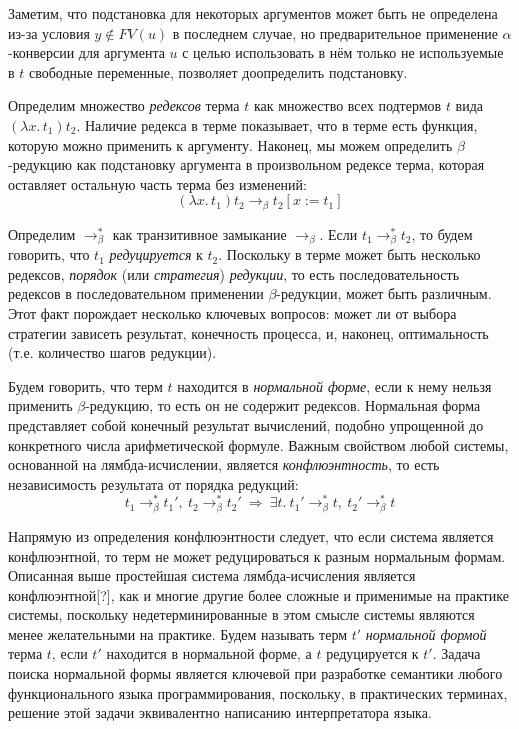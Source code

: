 \documentclass[../diploma.tex]{subfiles}
\begin{document}
Заметим, что подстановка для некоторых аргументов может быть не определена из-за условия $y \notin FV(u)$ в последнем случае, но предварительное применение $\alpha$-конверсии для аргумента $u$ с целью использовать в нём только не используемые в $t$ свободные переменные, позволяет доопределить подстановку.

Определим множество \textit{редексов} терма $t$ как множество всех подтермов $t$ вида $(\lambda x.\, t_1) t_2$. Наличие редекса в терме показывает, что в терме есть функция, которую можно применить к аргументу. Наконец, мы можем определить $\beta$-редукцию как подстановку аргумента в произвольном редексе терма, которая оставляет остальную часть терма без изменений:
$$(\lambda x.\, t_1) t_2 \rightarrow_\beta t_2 [x := t_1]$$

Определим $\rightarrow_\beta^*$ как транзитивное замыкание $\rightarrow_\beta$. Если $t_1 \rightarrow_\beta^* t_2$, то будем говорить, что $t_1$ \textit{редуцируется} к $t_2$. Поскольку в терме может быть несколько редексов, \textit{порядок} (или \textit{стратегия}) \textit{редукции}, то есть последовательность редексов в последовательном применении $\beta$-редукции, может быть различным. Этот факт порождает несколько ключевых вопросов: может ли от выбора стратегии зависеть результат, конечность процесса, и, наконец, оптимальность (т.е. количество шагов редукции).

Будем говорить, что терм $t$ находится в \textit{нормальной форме}, если к нему нельзя применить $\beta$-редукцию, то есть он не содержит редексов. Нормальная форма представляет собой конечный результат вычислений, подобно упрощенной до конкретного числа арифметической формуле. Важным свойством любой системы, основанной на лямбда-исчислении, является \textit{конфлюэнтность}, то есть независимость результата от порядка редукций:
$$t_1 \rightarrow_\beta^* t_1',\ t_2 \rightarrow_\beta^* t_2' \ \Rightarrow\ \exists t.\ t_1' \rightarrow_\beta^* t,\ t_2' \rightarrow_\beta^* t$$

Напрямую из определения конфлюэнтности следует, что если система является конфлюэнтной, то терм не может редуцироваться к разным нормальным формам. Описанная выше простейшая система лямбда-исчисления является конфлюэнтной[?], как и многие другие более сложные и применимые на практике системы, поскольку недетерминированные в этом смысле системы являются менее желательными на практике. Будем называть терм $t'$ \textit{нормальной формой} терма $t$, если $t'$ находится в нормальной форме, а $t$ редуцируется к $t'$. Задача поиска нормальной формы является ключевой при разработке семантики любого функционального языка программирования, поскольку, в практических терминах, решение этой задачи эквивалентно написанию интерпретатора языка. 
\end{document}
